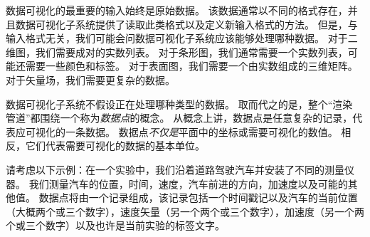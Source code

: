 数据可视化的最重要的输入始终是原始数据。 该数据通常以不同的格式存在，并且数据可视化子系统提供了读取此类格式以及定义新输入格式的方法。 但是，与输入格式无关，我们可能会问数据可视化子系统应该能够处理哪种数据。 对于二维图，我们需要成对的实数列表。 对于条形图，我们通常需要一个实数列表，可能还需要一些颜色和标签。 对于表面图，我们需要一个由实数组成的三维矩阵。 对于矢量场，我们需要更复杂的数据。


数据可视化子系统不假设正在处理哪种类型的数据。 取而代之的是，整个``渲染 管道''都围绕一个称为\emph{数据点}的概念。 从概念上讲，数据点是任意复杂的记录，代表应可视化的一条数据。 数据点\emph{不仅是}平面中的坐标或需要可视化的数值。 相反，它们代表需要可视化的数据的基本单位。


请考虑以下示例：在一个实验中，我们沿着道路驾驶汽车并安装了不同的测量仪器。 我们测量汽车的位置，时间，速度，汽车前进的方向，加速度以及可能的其他值。 数据点将由一个记录组成，该记录包括一个时间戳记以及汽车的当前位置（大概两个或三个数字），速度矢量（另一个两个或三个数字），加速度（另一个两个或三个数字）以及也许是当前实验的标签文字。


